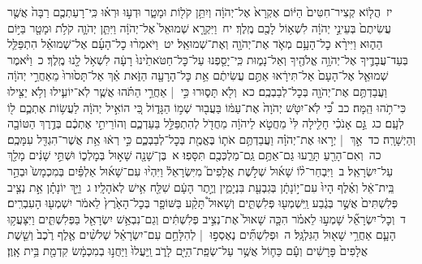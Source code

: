 \documentclass[18pt]{article}
\begin{document}
 {\loc יז~}הֲל֤וֹא קְצִיר־חִטִּים֙ הַיּ֔וֹם אֶקְרָא֙ אֶל־יְהֹוָ֔ה וְיִתֵּ֥ן קֹל֖וֹת וּמָטָ֑ר וּדְע֣וּ וּרְא֗וּ כִּֽי־רָעַתְכֶ֤ם רַבָּה֙ אֲשֶׁ֤ר עֲשִׂיתֶם֙ בְּעֵינֵ֣י יְהֹוָ֔ה לִשְׁא֥וֹל לָכֶ֖ם מֶֽלֶךְ׃ \startlock
 {\loc יח~}וַיִּקְרָ֤א שְׁמוּאֵל֙ אֶל־יְהֹוָ֔ה וַיִּתֵּ֧ן יְהֹוָ֛ה קֹלֹ֥ת וּמָטָ֖ר בַּיּ֣וֹם הַה֑וּא וַיִּירָ֨א כׇל־הָעָ֥ם מְאֹ֛ד אֶת־יְהֹוָ֖ה וְאֶת־שְׁמוּאֵֽל׃ \startlock
 {\loc יט~}וַיֹּאמְר֨וּ כׇל־הָעָ֜ם אֶל־שְׁמוּאֵ֗ל הִתְפַּלֵּ֧ל בְּעַד־עֲבָדֶ֛יךָ אֶל־יְהֹוָ֥ה אֱלֹהֶ֖יךָ וְאַל־נָמ֑וּת כִּֽי־יָסַ֤פְנוּ עַל־כׇּל־חַטֹּאתֵ֙ינוּ֙ רָעָ֔ה לִשְׁאֹ֥ל לָ֖נוּ מֶֽלֶךְ׃ \startlock
 {\loc כ~}וַיֹּ֨אמֶר שְׁמוּאֵ֤ל אֶל־הָעָם֙ אַל־תִּירָ֔אוּ אַתֶּ֣ם עֲשִׂיתֶ֔ם אֵ֥ת כׇּל־הָרָעָ֖ה הַזֹּ֑את אַ֗ךְ אַל־תָּס֙וּרוּ֙ מֵאַחֲרֵ֣י יְהֹוָ֔ה וַעֲבַדְתֶּ֥ם אֶת־יְהֹוָ֖ה בְּכׇל־לְבַבְכֶֽם׃ \startlock
 {\loc כא~}וְלֹ֖א תָּס֑וּרוּ כִּ֣י  |  אַחֲרֵ֣י הַתֹּ֗הוּ אֲשֶׁ֧ר לֹֽא־יוֹעִ֛ילוּ וְלֹ֥א יַצִּ֖ילוּ כִּי־תֹ֥הוּ הֵֽמָּה׃ \startlock
 {\loc כב~}כִּ֠י לֹֽא־יִטֹּ֤שׁ יְהֹוָה֙ אֶת־עַמּ֔וֹ בַּעֲב֖וּר שְׁמ֣וֹ הַגָּד֑וֹל כִּ֚י הוֹאִ֣יל יְהֹוָ֔ה לַעֲשׂ֥וֹת אֶתְכֶ֛ם ל֖וֹ לְעָֽם׃ \startlock
 {\loc כג~}גַּ֣ם אָנֹכִ֗י חָלִ֤ילָה לִּי֙ מֵחֲטֹ֣א לַיהֹוָ֔ה מֵחֲדֹ֖ל לְהִתְפַּלֵּ֣ל בַּעַדְכֶ֑ם וְהוֹרֵיתִ֣י אֶתְכֶ֔ם בְּדֶ֥רֶךְ הַטּוֹבָ֖ה וְהַיְשָׁרָֽה׃ \startlock
 {\loc כד~}אַ֣ךְ  |  יְר֣אוּ אֶת־יְהֹוָ֗ה וַעֲבַדְתֶּ֥ם אֹת֛וֹ בֶּאֱמֶ֖ת בְּכׇל־לְבַבְכֶ֑ם כִּ֣י רְא֔וּ אֵ֥ת אֲשֶׁר־הִגְדִּ֖ל עִמָּכֶֽם׃ \startlock
 {\loc כה~}וְאִם־הָרֵ֖עַ תָּרֵ֑עוּ גַּם־אַתֶּ֥ם גַּֽם־מַלְכְּכֶ֖ם תִּסָּפֽוּ׃ 
\startlock
 {\loc א~}בֶּן־שָׁנָ֖ה שָׁא֣וּל בְּמׇלְכ֑וֹ וּשְׁתֵּ֣י שָׁנִ֔ים מָלַ֖ךְ עַל־יִשְׂרָאֵֽל׃ \startlock
 {\loc ב~}וַיִּבְחַר־ל֨וֹ שָׁא֜וּל שְׁלֹ֣שֶׁת אֲלָפִים֮ מִיִּשְׂרָאֵל֒ וַיִּהְי֨וּ עִם־שָׁא֜וּל אַלְפַּ֗יִם בְּמִכְמָשׂ֙ וּבְהַ֣ר בֵּֽית־אֵ֔ל וְאֶ֗לֶף הָיוּ֙ עִם־י֣וֹנָתָ֔ן בְּגִבְעַ֖ת בִּנְיָמִ֑ין וְיֶ֣תֶר הָעָ֔ם שִׁלַּ֖ח אִ֥ישׁ לְאֹהָלָֽיו׃ \startlock
 {\loc ג~}וַיַּ֣ךְ יוֹנָתָ֗ן אֵ֣ת נְצִ֤יב פְּלִשְׁתִּים֙ אֲשֶׁ֣ר בְּגֶ֔בַע וַֽיִּשְׁמְע֖וּ פְּלִשְׁתִּ֑ים וְשָׁאוּל֩ תָּקַ֨ע בַּשּׁוֹפָ֤ר בְּכׇל־הָאָ֙רֶץ֙ לֵאמֹ֔ר יִשְׁמְע֖וּ הָעִבְרִֽים׃ \startlock
 {\loc ד~}וְכׇל־יִשְׂרָאֵ֞ל שָׁמְע֣וּ לֵאמֹ֗ר הִכָּ֤ה שָׁאוּל֙ אֶת־נְצִ֣יב פְּלִשְׁתִּ֔ים וְגַם־נִבְאַ֥שׁ יִשְׂרָאֵ֖ל בַּפְּלִשְׁתִּ֑ים וַיִּצָּעֲק֥וּ הָעָ֛ם אַחֲרֵ֥י שָׁא֖וּל הַגִּלְגָּֽל׃ \startlock
 {\loc ה~}וּפְלִשְׁתִּ֞ים נֶאֶסְפ֣וּ  |  לְהִלָּחֵ֣ם עִם־יִשְׂרָאֵ֗ל שְׁלֹשִׁ֨ים אֶ֤לֶף רֶ֙כֶב֙ וְשֵׁ֤שֶׁת אֲלָפִים֙ פָּרָשִׁ֔ים וְעָ֕ם כַּח֛וֹל אֲשֶׁ֥ר עַל־שְׂפַֽת־הַיָּ֖ם לָרֹ֑ב וַֽיַּעֲלוּ֙ וַיַּחֲנ֣וּ בְמִכְמָ֔שׂ קִדְמַ֖ת בֵּ֥ית אָֽוֶן׃ \startlock
\end{document}
